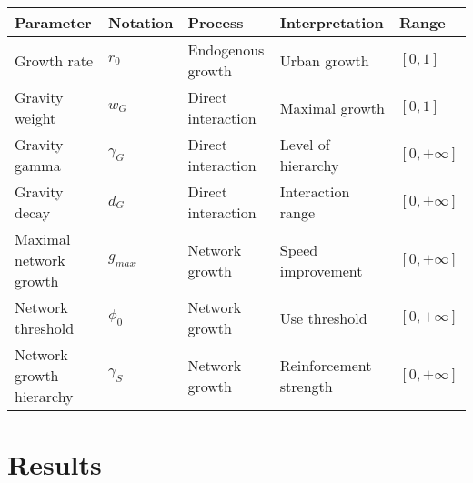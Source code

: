 \begin{table}
\caption{\label{tab:parameters}}	
\begin{tabular}{|l|l|l|l|l|}
\hline
Parameter & Notation & Process & Interpretation & Range\\
\hline
Growth rate & $r_0$ & Endogenous growth & Urban growth & $\left[ 0,1\right]$ \\
Gravity weight & $w_G$ & Direct interaction & Maximal growth & $\left[ 0,1\right]$ \\
Gravity gamma & $\gamma_G$ & Direct interaction & Level of hierarchy & $\left[ 0,+\infty\right]$ \\
Gravity decay & $d_G$ & Direct interaction & Interaction range & $\left[ 0,+\infty\right]$ \\
Maximal network growth & $g_{max}$ & Network growth & Speed improvement & $\left[ 0,+\infty\right]$ \\
Network threshold & $\phi_0$ & Network growth & Use threshold & $\left[ 0,+\infty\right]$ \\
Network growth hierarchy & $\gamma_S$ & Network growth & Reinforcement strength & $\left[ 0,+\infty\right]$ \\
\hline
\end{tabular}
\end{table}



\section{Results}





